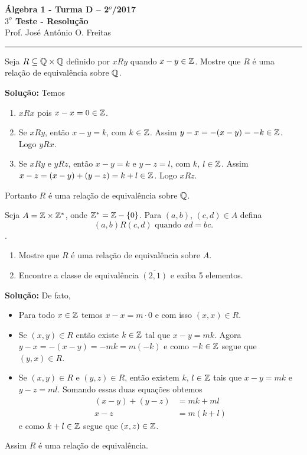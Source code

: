 \documentclass[12pt]{article}
\begin{document}


\begin{center}
{\Large\bf {\'A}lgebra 1 - Turma D -- 2$^{o}$/2017} \\ \vspace{9pt} {\large\bf
  $3^{\underline{o}}$ Teste - Resolu\c{c}\~ao}\\
\vspace{9pt} Prof. Jos{\'e} Ant{\^o}nio O. Freitas
\end{center}
\hrule

\vspace{.6cm}

\questao Seja $R \subseteq \mathbb{Q} \times \mathbb{Q}$ definido por $xRy$ quando $x - y \in \mathbb{Z}$. Mostre que $R$ é uma relação de equivalência sobre $\mathbb{Q}$.

\noindent\textbf{Solu\c{c}\~ao:} Temos
\begin{enumerate}[label={\roman*})]
	\item $xRx$ pois $x - x = 0 \in \mathbb{Z}$.
	\item Se $xRy$, então $x - y = k$, com $k \in \mathbb{Z}$. Assim $y - x = -(x - y) = -k \in \mathbb{Z}$. Logo $yRx$.
	\item Se $xRy$ e $yRz$, então $x - y = k$ e $y - z = l$, com $k$, $l \in \mathbb{Z}$. Assim $x - z = (x - y) + (y - z) = k + l \in \mathbb{Z}$. Logo $xRz$.
\end{enumerate}

Portanto $R$ é uma relação de equivalência sobre $\mathbb{Q}$.


\vspace{.5cm}

\questao Seja $A = \mathbb{Z} \times \mathbb{Z}^*$, onde $\mathbb{Z}^* = \mathbb{Z} - \{0\}$. Para $(a,b)$, $(c,d) \in A$ defina
\[
	(a,b)R(c,d) \mbox{ quando } ad=bc.
\].

\begin{enumerate}
	\item Mostre que $R$ é uma rela{\c c}{\~a}o de equival{\^e}ncia sobre $A$.
	\item Encontre a classe de equivalência $\overline{(2,1)}$ e exiba 5 elementos.
\end{enumerate}

\noindent\textbf{Solu\c{c}\~ao:} De fato,
	\begin{itemize}
		\item Para todo $x\in \mathbb{Z}$ temos $x - x = m\cdot0$ e com isso $(x,x) \in R$.
		\item Se $(x,y) \in R$ então existe $k \in \mathbb{Z}$ tal que $x - y = mk$. Agora $y - x = -(x - y) = -mk = m (-k)$ e como $-k \in \mathbb{Z}$ segue que $(y,x) \in R$.
		\item Se $(x,y) \in R$ e $(y,z) \in R$, então existem $k$, $l\in \mathbb{Z}$ tais que $x - y = mk$ e $y - z = ml$.
		Somando essas duas equações obtemos
		\begin{align*}
			(x - y) + (y - z) &= mk + ml\\
			x - z &= m(k + l)
		\end{align*}
		e como $k + l \in \mathbb{Z}$ segue que $(x,z) \in \mathbb{Z}$.
	\end{itemize}
	
	Assim $R$ é uma relação de equivalência.
\end{document}
